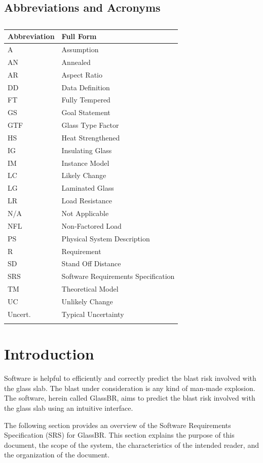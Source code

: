 \documentclass[12pt]{article}
\begin{document}
\subsection{Abbreviations and Acronyms}
\label{Sec:TAbbAcc}
\begin{longtable}{l l}
\toprule
\textbf{Abbreviation} & \textbf{Full Form}
\\
\midrule
\endhead
A & Assumption
\\
AN & Annealed
\\
AR & Aspect Ratio
\\
DD & Data Definition
\\
FT & Fully Tempered
\\
GS & Goal Statement
\\
GTF & Glass Type Factor
\\
HS & Heat Strengthened
\\
IG & Insulating Glass
\\
IM & Instance Model
\\
LC & Likely Change
\\
LG & Laminated Glass
\\
LR & Load Resistance
\\
N/A & Not Applicable
\\
NFL & Non-Factored Load
\\
PS & Physical System Description
\\
R & Requirement
\\
SD & Stand Off Distance
\\
SRS & Software Requirements Specification
\\
TM & Theoretical Model
\\
UC & Unlikely Change
\\
Uncert. & Typical Uncertainty
\\
\bottomrule
\caption{}
\label{Table:TAbbAcc}
\end{longtable}
\section{Introduction}
\label{Sec:Intro}
Software is helpful to efficiently and correctly predict the blast risk involved with the glass slab. The blast under consideration is any kind of man-made explosion. The software, herein called GlassBR, aims to predict the blast risk involved with the glass slab using an intuitive interface.

The following section provides an overview of the Software Requirements Specification (SRS) for GlassBR. This section explains the purpose of this document, the scope of the system, the characteristics of the intended reader, and the organization of the document.
\end{document}
